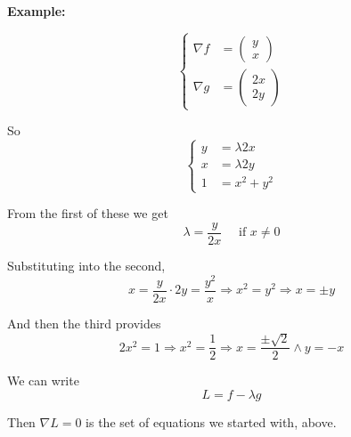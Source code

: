 \textbf{Example:}

\begin{equation}
  \begin{cases}
    \nabla f & = 
    \begin{pmatrix}
      y \\ x
    \end{pmatrix}
    \\[8mm]
    \nabla g & =
    \begin{pmatrix}
      2x \\ 2y
    \end{pmatrix}
  \end{cases}
\end{equation}

So
\begin{equation}
  \begin{cases}
    y & = \lambda 2x
    \\
    x & = \lambda 2y
    \\
    1 & = x^2 + y^2
  \end{cases}
\end{equation}

From the first of these we get
\begin{displaymath}
  \lambda = \frac{y}{2x} \quad \mbox{ if } x \neq 0
\end{displaymath}

Substituting into the second,
\begin{displaymath}
  x = \frac{y}{2x} \cdot 2y = \frac{y^2}{x} \Rightarrow x^2 = y^2
  \Rightarrow x = \pm y
\end{displaymath}

And then the third provides
\begin{displaymath}
  2x^2 = 1 \Rightarrow x^2 = \frac 12 \Rightarrow \boxed{x =
  \frac{\pm\sqrt{2}}{2} \wedge y = -x}
\end{displaymath}





We can write
\begin{displaymath}
  L = f - \lambda g
\end{displaymath}

Then $\nabla L = 0$ is the set of equations we started with, above.

